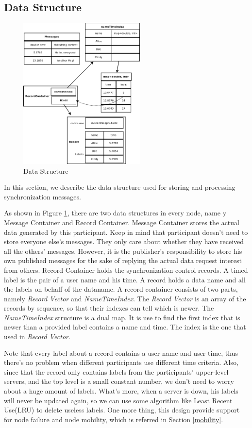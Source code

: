 \documentclass[conference]{IEEEtran}
\begin{document}
\subsection{Data Structure}
\begin{figure}[!t]
\centering
\includegraphics[width=2.5in]{../png/data-structure.png}
\caption{Data Structure}
\label{data_structure}
\end{figure}
In this section,
we describe the data structure used for storing and processing synchronization messages.

As shown in Figure \ref{data_structure}, there are two data structures in every node, name
y Message Container and Record Container.
Message Container stores the actual data generated by this participant.
Keep in mind that participant doesn't need to store everyone else's messages.
They only care about whether they have received all the others' messages.
However, it is the publisher's responsibility to store his own published messages
for the sake of replying the actual data request interest from others.
Record Container holds the synchronization control records.
A timed label is the pair of a user name and his time.
A record holds a data name and all the labels on behalf of the dataname.
A record container consists of two parts, namely \emph{Record Vector} and \emph{NameTimeIndex}.
The \emph{Record Vector} is an array of the records by sequence,
so that their indexes can tell which is newer.
The \emph{NameTimeIndex} structure is a dual map.
It is use to find the first index that is newer than a provided label contains a name and time.
The index is the one that used in \emph{Record Vector}.

Note that every label about a record contains a user name and user time,
thus there's no problem when different participants use different time criteria.
Also, since that the record only contains labels from the participants' upper-level servers,
and the top level is a small constant number, we don't need to worry about a huge amount of labels.
What's more, when a server is down, his labels will never be updated again,
so we can use some algorithm like Least Recent Use(LRU)\cite{LRU} to delete useless labels. One more thing,
this design provide support for node failure and node mobility, which is referred in Section \ref{mobility}.
\end{document}
